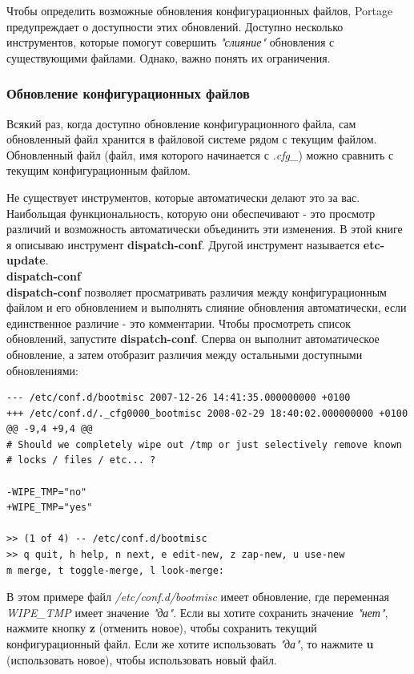 \documentclass[10pt]{book}
\begin{document}
Чтобы определить возможные обновления конфигурационных файлов, Portage предупреждает о доступности этих обновлений. Доступно несколько инструментов, которые помогут совершить \textit{"слияние"} обновления с  существующими файлами. Однако, важно понять их ограничения.

\subsubsection{Обновление конфигурационных файлов}

Всякий раз, когда доступно обновление конфигурационного файла, сам обновленный файл хранится в файловой системе рядом с текущим файлом. Обновленный файл (файл, имя которого начинается с \textit{.cfg\_}) можно сравнить с текущим конфигурационным файлом.

Не существует инструментов, которые автоматически делают это за вас. Наибольщая функциональность, которую они обеспечивают - это просмотр различий и возможность автоматически объединить эти изменения. В этой книге я описываю инструмент \textbf{dispatch-conf}. Другой инструмент называется \textbf{ etc-update}.\\

\textbf{dispatch-conf}\\

 \textbf{dispatch-conf} позволяет просматривать различия между конфигурационным файлом и его обновлением и выполнять слияние обновления автоматически, если единственное различие - это комментарии.
Чтобы просмотреть список обновлений, запустите  \textbf{dispatch-conf}. Сперва он выполнит автоматическое обновление, а затем отобразит различия между остальными доступными обновлениями:

\begin{tcolorbox}
\begin{lstlisting}
--- /etc/conf.d/bootmisc 2007-12-26 14:41:35.000000000 +0100
+++ /etc/conf.d/._cfg0000_bootmisc 2008-02-29 18:40:02.000000000 +0100
@@ -9,4 +9,4 @@
# Should we completely wipe out /tmp or just selectively remove known
# locks / files / etc... ?

-WIPE_TMP="no"
+WIPE_TMP="yes"

>> (1 of 4) -- /etc/conf.d/bootmisc
>> q quit, h help, n next, e edit-new, z zap-new, u use-new
m merge, t toggle-merge, l look-merge:
\end{lstlisting}
\end{tcolorbox}

В этом примере файл \textit{ /etc/conf.d/bootmisc} имеет обновление, где переменная \textit{WIPE\_TMP} имеет значение \textit{"да"}. Если вы хотите сохранить значение \textit{"нет"}, нажмите кнопку \textbf{z} (отменить новое), чтобы сохранить текущий конфигурационный файл. Если же хотите использовать \textit{"да"}, то нажмите \textbf{u} (использовать новое), чтобы использовать новый файл.
\end{document}
